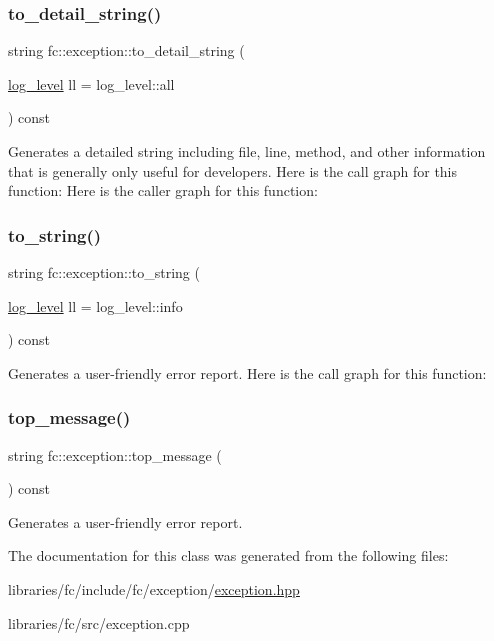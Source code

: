 \subsubsection{\texorpdfstring{to\+\_\+detail\+\_\+string()}{to\_detail\_string()}}
{\footnotesize\ttfamily string fc\+::exception\+::to\+\_\+detail\+\_\+string (\begin{DoxyParamCaption}\item[{\mbox{\hyperlink{classfc_1_1log__level}{log\+\_\+level}}}]{ll = {\ttfamily log\+\_\+level\+:\+:all} }\end{DoxyParamCaption}) const}

Generates a detailed string including file, line, method, and other information that is generally only useful for developers. Here is the call graph for this function\+:
Here is the caller graph for this function\+:
\mbox{\label{classfc_1_1exception_adbc4557b14bc29b74e9cf9f0ed5fb8d8}} 
\subsubsection{\texorpdfstring{to\+\_\+string()}{to\_string()}}
{\footnotesize\ttfamily string fc\+::exception\+::to\+\_\+string (\begin{DoxyParamCaption}\item[{\mbox{\hyperlink{classfc_1_1log__level}{log\+\_\+level}}}]{ll = {\ttfamily log\+\_\+level\+:\+:info} }\end{DoxyParamCaption}) const}

Generates a user-\/friendly error report. Here is the call graph for this function\+:
\mbox{\label{classfc_1_1exception_aeea900db85f79e5b4be0710a9df373db}} 
\subsubsection{\texorpdfstring{top\+\_\+message()}{top\_message()}}
{\footnotesize\ttfamily string fc\+::exception\+::top\+\_\+message (\begin{DoxyParamCaption}{ }\end{DoxyParamCaption}) const}

Generates a user-\/friendly error report. 

The documentation for this class was generated from the following files\+:\begin{DoxyCompactItemize}
\item 
libraries/fc/include/fc/exception/\mbox{\hyperlink{exception_8hpp}{exception.\+hpp}}\item 
libraries/fc/src/exception.\+cpp\end{DoxyCompactItemize}

